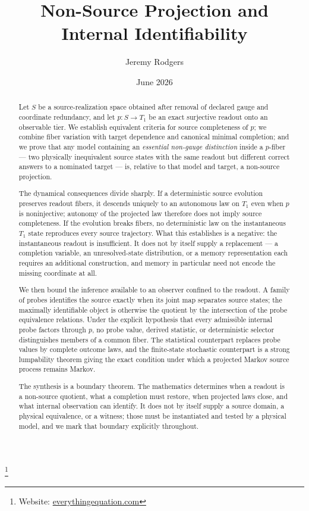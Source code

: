 \documentclass[11pt,reqno]{amsart}
\theoremstyle{plain}
\theoremstyle{definition}
\theoremstyle{remark}
\begin{document}
\title[Non-Source Projection and Internal Identifiability]
{Non-Source Projection and Internal Identifiability}

\author{Jeremy Rodgers}
\thanks{Website: \href{https://everythingequation.com}{everythingequation.com}}
\address{Independent Researcher}

\date{June 2026}


\begin{abstract}
Let $S$ be a source-realization space obtained after removal of declared gauge and coordinate redundancy, and let $p\colon S\to T_1$ be an exact surjective readout onto an observable tier. We establish equivalent criteria for source completeness of $p$; we combine fiber variation with target dependence and canonical minimal completion; and we prove that any model containing an \emph{essential non-gauge distinction} inside a $p$-fiber --- two physically inequivalent source states with the same readout but different correct answers to a nominated target --- is, relative to that model and target, a non-source projection.

The dynamical consequences divide sharply. If a deterministic source evolution preserves readout fibers, it descends uniquely to an autonomous law on $T_1$ even when $p$ is noninjective; autonomy of the projected law therefore does not imply source completeness. If the evolution breaks fibers, no deterministic law on the instantaneous $T_1$ state reproduces every source trajectory. What this establishes is a negative: the instantaneous readout is insufficient. It does not by itself supply a replacement --- a completion variable, an unresolved-state distribution, or a memory representation each requires an additional construction, and memory in particular need not encode the missing coordinate at all.

We then bound the inference available to an observer confined to the readout. A family of probes identifies the source exactly when its joint map separates source states; the maximally identifiable object is otherwise the quotient by the intersection of the probe equivalence relations. Under the explicit hypothesis that every admissible internal probe factors through $p$, no probe value, derived statistic, or deterministic selector distinguishes members of a common fiber. The statistical counterpart replaces probe values by complete outcome laws, and the finite-state stochastic counterpart is a strong lumpability theorem giving the exact condition under which a projected Markov source process remains Markov.

The synthesis is a boundary theorem. The mathematics determines when a readout is a non-source quotient, what a completion must restore, when projected laws close, and what internal observation can identify. It does not by itself supply a source domain, a physical equivalence, or a witness; those must be instantiated and tested by a physical model, and we mark that boundary explicitly throughout.
\end{abstract}
\end{document}
